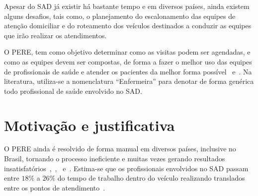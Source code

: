 Apesar do \ac{SAD} já existir há bastante tempo e em diversos países, ainda existem alguns desafios, tais como, o planejamento do escalonamento das equipes de atenção domiciliar e do roteamento dos veículos destinados a conduzir as equipes que irão realizar os atendimentos.

O \ac{PERE}, tem como objetivo determinar como as visitas podem ser agendadas, e como as equipes devem ser compostas, de forma a fazer o melhor uso das equipes de profissionais de saúde e atender os pacientes da melhor forma possível~\cite{Bertels:2006} e~\cite{Decerle:2016}. Na literatura, utiliza-se a nomenclatura ``Enfermeira'' para denotar de forma genérica todo profissional de saúde envolvido no \ac{SAD}.




\section{Motivação e justificativa}

O \ac{PERE} ainda é resolvido de forma manual em diversos países, inclusive no Brasil, tornando o processo ineficiente e muitas vezes gerando resultados insatisfatórios~\cite{cheng:98},~\cite{bachouch:2010},~\cite{tozlu:2016} e~\cite{cattafi:2012}.
Estima-se que os profissionais envolvidos no \ac{SAD} passam entre $18\%$ a $26\%$ do tempo de trabalho dentro do veículo realizando translados entre os pontos de atendimento~\cite{holm:2014}.

